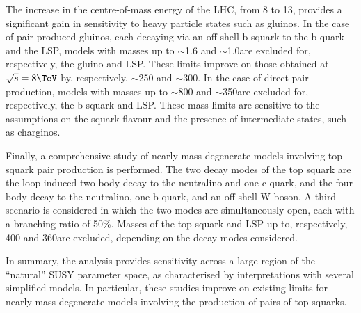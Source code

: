 The increase in the centre-of-mass energy of the LHC, from 8 to
13\TeV, provides a significant gain in sensitivity to heavy particle
states such as gluinos. In the case of pair-produced gluinos, each
decaying via an off-shell b squark to the b quark and the LSP, models
with masses up to $\sim$1.6 and $\sim$1.0\TeV are excluded for,
respectively, the gluino and LSP. These limits improve on those
obtained at $\sqrt{s} = 8\TeV$ by, respectively, $\sim$250 and
$\sim$300\GeV. In the case of direct pair production, models with
masses up to $\sim$800 and $\sim$350\GeV are excluded for,
respectively, the b squark and LSP. These mass limits are sensitive to
the assumptions on the squark flavour and the presence of intermediate
states, such as charginos.

Finally, a comprehensive study of nearly mass-degenerate models
involving top squark pair production is performed. The two decay modes
of the top squark are the loop-induced two-body decay to the
neutralino and one c quark, and the four-body decay to the neutralino,
one b quark, and an off-shell W boson. A third scenario is considered
in which the two modes are simultaneously open, each with a branching
ratio of 50\%. Masses of the top squark and LSP up to, respectively,
400 and 360\GeV are excluded, depending on the decay modes considered.

In summary, the analysis provides sensitivity across a large region of
the ``natural'' SUSY parameter space, as characterised by
interpretations with several simplified models. In particular, these
studies improve on existing limits for nearly mass-degenerate models
involving the production of pairs of top squarks.
